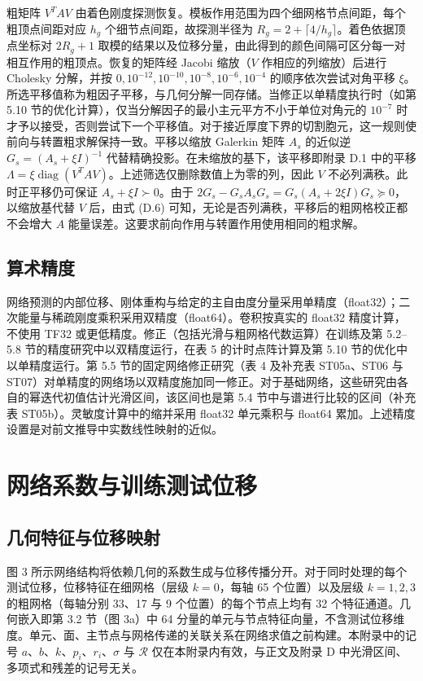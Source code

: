 \documentclass[preprint,12pt,authoryear]{elsarticle}
\begin{document}
粗矩阵 \(V^TAV\) 由着色刚度探测恢复。模板作用范围为四个细网格节点间距，每个粗顶点间距对应 \(h_g\) 个细节点间距，故探测半径为 \(R_g=2+\lceil4/h_g\rceil\)。着色依据顶点坐标对 \(2R_g+1\) 取模的结果以及位移分量，由此得到的颜色间隔可区分每一对相互作用的粗顶点。恢复的矩阵经 Jacobi 缩放（\(V\) 作相应的列缩放）后进行 Cholesky 分解，并按 \(0,10^{-12},10^{-10},10^{-8},10^{-6},10^{-4}\) 的顺序依次尝试对角平移 \(\xi\)。所选平移值称为粗因子平移，与几何分解一同存储。当修正以单精度执行时（如第 5.10 节的优化计算），仅当分解因子的最小主元平方不小于单位对角元的 \(10^{-7}\) 时才予以接受，否则尝试下一个平移值。对于接近厚度下界的切割胞元，这一规则使前向与转置粗求解保持一致。平移以缩放 Galerkin 矩阵 \(A_s\) 的近似逆 \(G_s=(A_s+\xi I)^{-1}\) 代替精确投影。在未缩放的基下，该平移即附录 D.1 中的平移 \(\Lambda=\xi\operatorname{diag}(V^TAV)\)。上述筛选仅删除数值上为零的列，因此 \(V\) 不必列满秩。此时正平移仍可保证 \(A_s+\xi I\succ0\)。由于 \(2G_s-G_sA_sG_s=G_s(A_s+2\xi I)G_s\succeq0\)，以缩放基代替 \(V\) 后，由式 (D.6) 可知，无论是否列满秩，平移后的粗网格校正都不会增大 \(A\) 能量误差。这要求前向作用与转置作用使用相同的粗求解。

\subsection{算术精度}

网络预测的内部位移、刚体重构与给定的主自由度分量采用单精度（float32）；二次能量与稀疏刚度乘积采用双精度（float64）。卷积按真实的 float32 精度计算，不使用 TF32 或更低精度。修正（包括光滑与粗网格代数运算）在训练及第 5.2--5.8 节的精度研究中以双精度运行，在表 5 的计时点阵计算及第 5.10 节的优化中以单精度运行。第 5.5 节的固定网络修正研究（表 4 及补充表 ST05a、ST06 与 ST07）对单精度的网络场以双精度施加同一修正。对于基础网络，这些研究由各自的幂迭代初值估计光滑区间，该区间也是第 5.4 节中与谱进行比较的区间（补充表 ST05b）。灵敏度计算中的缩并采用 float32 单元乘积与 float64 累加。上述精度设置是对前文推导中实数线性映射的近似。

\section{网络系数与训练测试位移}

\subsection{几何特征与位移映射}

图 3 所示网络结构将依赖几何的系数生成与位移传播分开。对于同时处理的每个测试位移，位移特征在细网格（层级 \(k=0\)，每轴 65 个位置）以及层级 \(k=1,2,3\) 的粗网格（每轴分别 33、17 与 9 个位置）的每个节点上均有 32 个特征通道。几何嵌入即第 3.2 节（图 3a）中 64 分量的单元与节点特征向量，不含测试位移维度。单元、面、主节点与网格传递的关联关系在网络求值之前构建。本附录中的记号 \(a\)、\(b\)、\(k\)、\(p_i\)、\(r_i\)、\(\sigma\) 与 \(\mathcal R\) 仅在本附录内有效，与正文及附录 D 中光滑区间、多项式和残差的记号无关。
\end{document}
